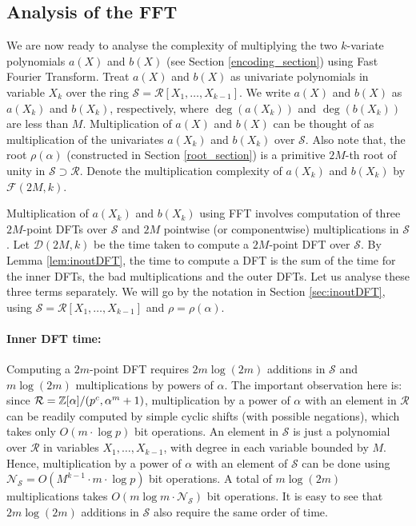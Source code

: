 \documentclass[11pt]{article}
\begin{document}
\subsection{Analysis of the FFT}\label{fourier_analysis}

We are now ready to analyse the complexity of multiplying the two
$k$-variate polynomials $a(X)$ and $b(X)$ (see Section
\ref{encoding_section}) using Fast Fourier Transform. Treat $a(X)$ and
$b(X)$ as univariate polynomials in variable $X_k$ over the ring
$\mathcal{S} = \mathcal{R}[X_1, \ldots, X_{k-1}]$. We write $a(X)$ and
$b(X)$ as $a(X_k)$ and $b(X_k)$, respectively, where $\deg(a(X_k))$
and $\deg(b(X_k))$ are less than $M$. Multiplication of $a(X)$ and
$b(X)$ can be thought of as multiplication of the univariates $a(X_k)$
and $b(X_k)$ over $\mathcal{S}$. Also note that, the root
$\rho(\alpha)$ (constructed in Section \ref{root_section}) is a
primitive $2M$-th root of unity in $\mathcal{S} \supset
\mathcal{R}$. Denote the multiplication complexity of $a(X_k)$ and
$b(X_k)$ by $\mathcal{F}(2M, k)$.

Multiplication of $a(X_k)$ and $b(X_k)$ using FFT involves computation
of three $2M$-point DFTs over $\mathcal{S}$ and $2M$ pointwise (or
componentwise) multiplications in $\mathcal{S}$. Let $\mathcal{D}(2M,
k)$ be the time taken to compute a $2M$-point DFT over
$\mathcal{S}$. By Lemma \ref{lem:inoutDFT}, the time to compute a DFT
is the sum of the time for the inner DFTs, the bad multiplications and
the outer DFTs. Let us analyse these three terms separately. We will
go by the notation in Section \ref{sec:inoutDFT}, using $\mathcal{S} =
\mathcal{R}[X_1, \ldots, X_{k-1}]$ and $\rho = \rho(\alpha)$.

\paragraph{Inner DFT time:} Computing a $2m$-point DFT requires $2m
\log (2m)$ additions in $\mathcal{S}$ and $m \log (2m)$
multiplications by powers of $\alpha$. The important observation here
is: since $\mathcal{R} = \mathbb{Z}[\alpha]/(p^c, \alpha^m + 1)$,
multiplication by a power of $\alpha$ with an element in $\mathcal{R}$
can be readily computed by simple cyclic shifts (with possible
negations), which takes only $O(m \cdot \log p)$ bit operations. An
element in $\mathcal{S}$ is just a polynomial over $\mathcal{R}$ in
variables $X_1, \ldots, X_{k-1}$, with degree in each variable bounded
by $M$. Hence, multiplication by a power of $\alpha$ with an element
of $\mathcal{S}$ can be done using $\mathcal{N}_{\mathcal{S}} =
O(M^{k-1} \cdot m \cdot \log p)$ bit operations. A total of $m \log
(2m)$ multiplications takes $O(m \log m \cdot
\mathcal{N}_{\mathcal{S}})$ bit operations. It is easy to see that $2m
\log (2m)$ additions in $\mathcal{S}$ also require the same order of
time.
\end{document}
